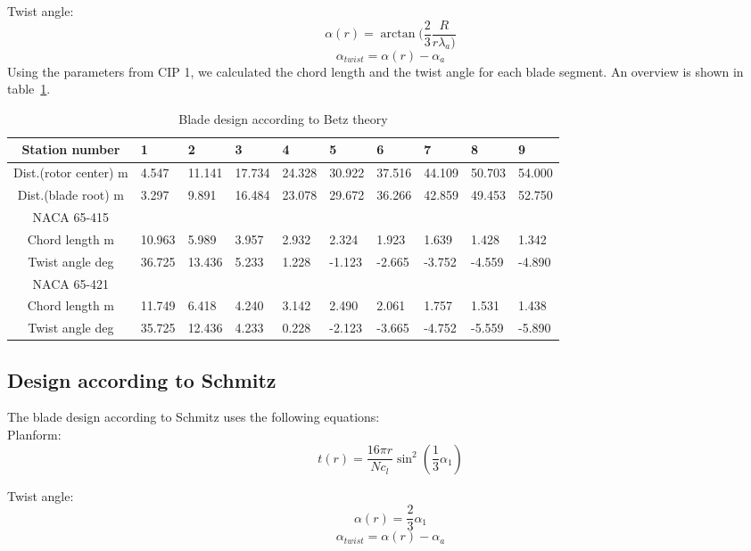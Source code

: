 \documentclass[10pt]{article}
\begin{document}
Twist angle:
\begin{equation}
\alpha(r) = \arctan(\frac{2}{3}\frac{R}{r\lambda_a)}
\end{equation}
\begin{equation}
\alpha_{twist} = \alpha(r) - \alpha_a
\end{equation}
Using the parameters from CIP 1, we calculated the chord length and the twist angle for each blade segment. An overview is shown in table~\ref{blade_design_betz}.
\begin{table}[H]
\begin{tabular}{c| l l l l l l l l l}
\hline
Station number & 	1&	2&	3	&4	&5	&6	&7	&8	&9\\
\hline
Dist.(rotor center)	m&	4.547&	11.141&	17.734&	24.328&	30.922&	37.516&	44.109&	50.703&	54.000\\
Dist.(blade root)	m&	3.297&	9.891&	16.484&	23.078&	29.672&	36.266&	42.859&	49.453&	52.750\\
\hline
NACA 65-415\\
\hline
Chord length	m&		10.963&	5.989&	3.957&	2.932	&2.324&	1.923&	1.639&	1.428&	1.342\\
Twist angle	deg	&	36.725	&13.436&	5.233&	1.228&	-1.123&	-2.665&	-3.752	&-4.559&	-4.890\\
\hline
NACA 65-421\\
\hline
Chord length	m	&	11.749&	6.418	&4.240&	3.142&	2.490&	2.061	&1.757&	1.531&	1.438
\\
Twist angle	deg	&	35.725&	12.436&	4.233&	0.228	&-2.123&	-3.665	&-4.752&	-5.559	&-5.890\\
\hline
\end{tabular}
\caption{Blade design according to Betz theory}
\label{blade_design_betz}
\end{table}
\subsection{Design according to Schmitz}
The blade design according to Schmitz uses the following equations:\\
Planform:
\begin{equation}
t(r) = \frac{16\pi r}{N c_l}\sin^2(\frac{1}{3}\alpha_1)
\end{equation}

Twist angle:
\begin{equation}
\alpha(r) = \frac{2}{3}\alpha_1
\end{equation}
\begin{equation}
\alpha_{twist} = \alpha(r) - \alpha_a
\end{equation}
\end{document}
